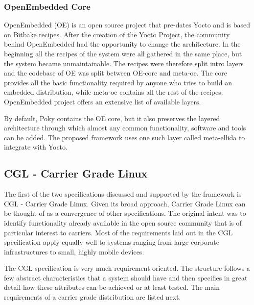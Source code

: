 \subsubsection*{OpenEmbedded Core}
OpenEmbedded (OE) is an open source project that pre-dates Yocto and is based on Bitbake recipes. After the creation of the Yocto Project, the community behind OpenEmbedded had the opportunity to change the architecture. In the beginning all the recipes of the system were all gathered in the same place, but the system became unmaintainable. The recipes were therefore split intro layers and the codebase of OE was split between OE-core and meta-oe. The core provides all the basic functionality required by anyone who tries to build an embedded distribution, while meta-oe contains all the rest of the recipes. OpenEmbedded project offers an extensive list of available layers.

By default, Poky contains the OE core, but it also preserves the layered architecture through which almost any common functionality, software and tools can be added. The proposed framework uses one such layer called meta-ellida to integrate with Yocto.

\subsection{CGL - Carrier Grade Linux}
The first of the two specifications discussed and supported by the framework is CGL - Carrier Grade Linux.
Given its broad approach, Carrier Grade Linux can be thought of as a convergence of other specifications. The original intent was to identify functionality already available in the open source community that is of particular interest to carriers. Most of the requirements laid out in the CGL specification apply equally well to systems ranging from large corporate infrastructures to small, highly mobile devices.

The CGL specification is very much requirement oriented. The structure follows a few abstract characteristics that a system should have and then specifies in great detail how these attributes can be achieved or at least tested. The main requirements of a carrier grade distribution are listed next.

